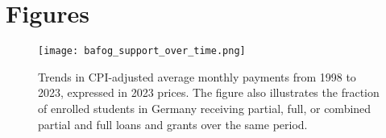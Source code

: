 \newpage
\section{Figures}
\renewcommand{\thefigure}{\thesection \arabic{figure}}
\setcounter{figure}{0}

\begin{figure}[H]
  \centering
  \texttt{[image: bafog\_support\_over\_time.png]}
  \caption{
      Trends in CPI-adjusted average monthly payments from 1998 to 2023, expressed in 2023 prices. The figure also illustrates the fraction of enrolled students in Germany receiving partial, full, or combined partial and full loans and grants over the same period.
  }
  \label{fig:test}
\end{figure}
